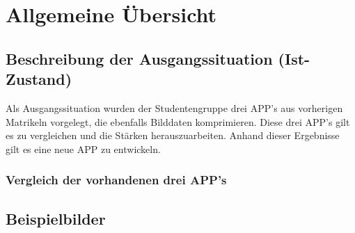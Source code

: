 %
%	


\section{Allgemeine Übersicht}

\subsection{\textbf{Beschreibung der Ausgangssituation (Ist-Zustand) }}

Als Ausgangssituation wurden der Studentengruppe drei \acs{APP}'s aus vorherigen Matrikeln vorgelegt, die ebenfalls Bilddaten komprimieren. Diese drei \acs{APP}'s gilt es zu vergleichen und die Stärken herauszuarbeiten. Anhand dieser Ergebnisse gilt es eine neue \acs{APP} zu entwickeln.


\subsubsection{Vergleich der vorhandenen drei \acs{APP}'s}
\begin{landscape}

\newpage






\end{landscape}


\subsection{Beispielbilder}

